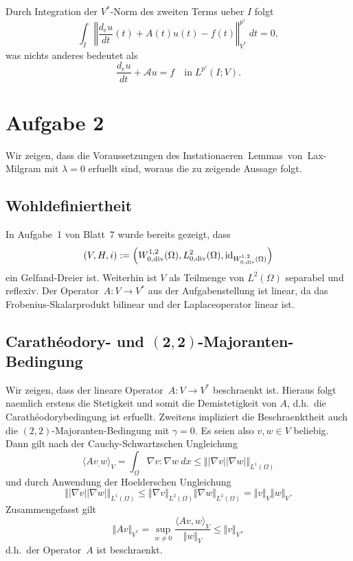 \documentclass{article}
\begin{document}
Durch Integration der $V^*$-Norm des zweiten Terms ueber $I$ folgt
\begin{equation*}
  \int_{I} {\left\Vert \frac{d_e u}{dt}(t) + A(t) u(t) - f(t) \right\Vert}_{V^*}^{p'} \ dt
  = 0,
\end{equation*}
was nichts anderes bedeutet als
\begin{equation*}
  \frac{d_e u}{dt} + \mathcal{A} u = f \quad \text{in} \; L^{p'}(I; V).
\end{equation*}

\section*{Aufgabe 2}

Wir zeigen, dass die Voraussetzungen des Instationaeren~Lemmas~von~Lax-Milgram mit $\lambda=0$ erfuellt sind, woraus die zu zeigende Aussage folgt.

\subsection*{Wohldefiniertheit}

In Aufgabe~1 von Blatt~7 wurde bereits gezeigt, dass
\begin{equation*}
  (V, H, i)
  :=
  \left(W_{0, \operatorname{div}}^{1,2}(\Omega), L_{0, \operatorname{div}}^2(\Omega), \operatorname{id}_{W_{0, \operatorname{div}}^{1,2}(\Omega)}\right)
\end{equation*}
ein Gelfand-Dreier ist. Weiterhin ist $V$ als Teilmenge von $L^2(\Omega)$ separabel und reflexiv. Der Operator~$A: V \rightarrow V^*$ aus der Aufgabenstellung ist linear, da das Frobenius-Skalarprodukt bilinear und der Laplaceoperator linear ist.

\subsection*{Carath\'eodory- und $\bm{(2, 2)}$-Majoranten-Bedingung}

Wir zeigen, dass der lineare Operator~$A: V \rightarrow V^*$ beschraenkt ist. Hieraus folgt naemlich erstens die Stetigkeit und somit die Demistetigkeit von $A$, d.h.\ die Carath\'eodorybedingung ist erfuellt. Zweitens impliziert die Beschraenkt\-heit auch die $(2, 2)$-Majoranten-Bedingung mit $\gamma=0$. Es seien also $v,w \in V$ beliebig. Dann gilt nach der Cauchy-Schwartzschen Ungleichung
\begin{equation*}
  \langle Av_, w \rangle_V
  = \int_{\Omega} \nabla v : \nabla w \ dx
  \leq {\Vert \vert \nabla v \vert \vert \nabla w \vert \Vert}_{L^1(\Omega)}
\end{equation*}
und durch Anwendung der Hoelderschen Ungleichung
\begin{equation*}
  {\Vert \vert \nabla v \vert \vert \nabla w \vert \Vert}_{L^1(\Omega)}
  \leq {\Vert \nabla v \Vert}_{L^2(\Omega)} {\Vert \nabla w \Vert}_{L^2(\Omega)}
  = {\Vert v \Vert}_{V} {\Vert w \Vert}_{V}.
\end{equation*}
Zusammengefasst gilt
\begin{equation*}
  {\Vert Av \Vert}_{V^*}
  = \sup_{w \ne 0} \frac{{\langle Av, w \rangle}_V}{{\Vert w \Vert}_V}
  \leq {\Vert v \Vert}_{V},
\end{equation*}
d.h.\ der Operator~$A$ ist beschraenkt.
\end{document}
